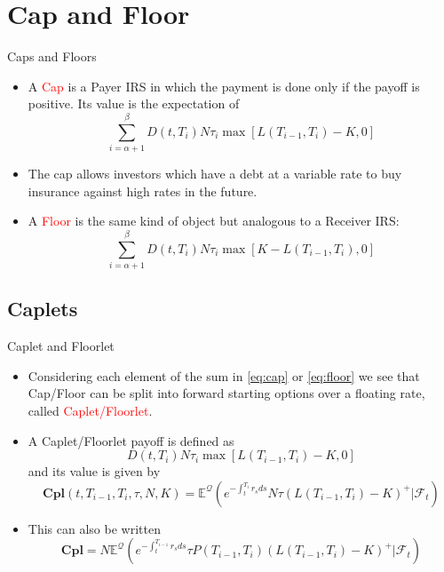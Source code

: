 \documentclass{beamer}
\begin{document}
\section{Cap and Floor}
\begin{frame}{Caps and Floors}
	\begin{itemize}
		\item<1-> A \textcolor{red}{Cap} is a Payer IRS in which the payment is done only if the payoff is positive. Its value is the expectation of 
		\begin{equation}
			\sum_{i=\alpha+1}^{\beta}D(t,T_i)N\tau_i\max\left[L(T_{i-1},T_i)-K,0\right]
			\label{eq:cap}
		\end{equation} 
		\item<1-> The cap allows investors which have a debt at a variable rate to buy insurance against high rates in the future.
	
		\item<2-> A \textcolor{red}{Floor} is the same kind of object but analogous to a Receiver IRS:
		\begin{equation}
			\sum_{i=\alpha+1}^{\beta}D(t,T_i)N\tau_i\max\left[K-L(T_{i-1},T_i),0\right]
			\label{eq:floor}
		\end{equation} 
	\end{itemize}
\end{frame}

\subsection{Caplets}
\begin{frame}{Caplet and Floorlet}
	\begin{itemize}
		\item<1-> Considering each element of the sum in \cref{eq:cap} or \cref{eq:floor} we see that Cap/Floor can be split into forward starting options over a floating rate, called \textcolor{red}{Caplet/Floorlet}.
		\item<2-> A Caplet/Floorlet payoff is defined as
		\begin{equation*}
			D(t,T_i)N\tau_i\max\left[L(T_{i-1},T_i)-K,0\right]
		\end{equation*} 
		and its value is given by
		\begin{equation}
			\textbf{Cpl}(t,T_{i-1},T_i,\tau,N,K)=\mathbb{E}^{\mathcal{Q}}\left(e^{-\int_t^{T_i}r_s ds}N\tau(L(T_{i-1},T_i)-K)^+ | \mathcal{F}_t\right)
		\end{equation}
		\item<3-> This can also be written
		\begin{equation*}
			\textbf{Cpl}=N\mathbb{E}^{\mathcal{Q}}\left(e^{-\int_t^{T_{i-1}}r_s ds}\tau P(T_{i-1},T_i)(L(T_{i-1},T_i)-K)^+ | \mathcal{F}_t\right)
		\end{equation*}
	\end{itemize}
\end{frame}
\end{document}
